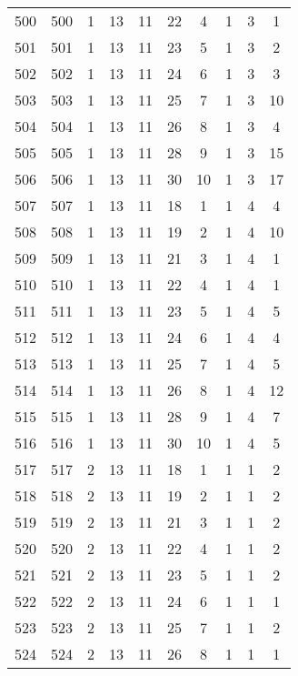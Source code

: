 \begin{longtable}{cccccccccc}
  500 & 500 &   1 &  13 &  11 &  22 &   4 &   1 &   3 &   1 \\ 
  501 & 501 &   1 &  13 &  11 &  23 &   5 &   1 &   3 &   2 \\ 
  502 & 502 &   1 &  13 &  11 &  24 &   6 &   1 &   3 &   3 \\ 
  503 & 503 &   1 &  13 &  11 &  25 &   7 &   1 &   3 &  10 \\ 
  504 & 504 &   1 &  13 &  11 &  26 &   8 &   1 &   3 &   4 \\ 
  505 & 505 &   1 &  13 &  11 &  28 &   9 &   1 &   3 &  15 \\ 
  506 & 506 &   1 &  13 &  11 &  30 &  10 &   1 &   3 &  17 \\ 
  507 & 507 &   1 &  13 &  11 &  18 &   1 &   1 &   4 &   4 \\ 
  508 & 508 &   1 &  13 &  11 &  19 &   2 &   1 &   4 &  10 \\ 
  509 & 509 &   1 &  13 &  11 &  21 &   3 &   1 &   4 &   1 \\ 
  510 & 510 &   1 &  13 &  11 &  22 &   4 &   1 &   4 &   1 \\ 
  511 & 511 &   1 &  13 &  11 &  23 &   5 &   1 &   4 &   5 \\ 
  512 & 512 &   1 &  13 &  11 &  24 &   6 &   1 &   4 &   4 \\ 
  513 & 513 &   1 &  13 &  11 &  25 &   7 &   1 &   4 &   5 \\ 
  514 & 514 &   1 &  13 &  11 &  26 &   8 &   1 &   4 &  12 \\ 
  515 & 515 &   1 &  13 &  11 &  28 &   9 &   1 &   4 &   7 \\ 
  516 & 516 &   1 &  13 &  11 &  30 &  10 &   1 &   4 &   5 \\ 
  517 & 517 &   2 &  13 &  11 &  18 &   1 &   1 &   1 &   2 \\ 
  518 & 518 &   2 &  13 &  11 &  19 &   2 &   1 &   1 &   2 \\ 
  519 & 519 &   2 &  13 &  11 &  21 &   3 &   1 &   1 &   2 \\ 
  520 & 520 &   2 &  13 &  11 &  22 &   4 &   1 &   1 &   2 \\ 
  521 & 521 &   2 &  13 &  11 &  23 &   5 &   1 &   1 &   2 \\ 
  522 & 522 &   2 &  13 &  11 &  24 &   6 &   1 &   1 &   1 \\ 
  523 & 523 &   2 &  13 &  11 &  25 &   7 &   1 &   1 &   2 \\ 
  524 & 524 &   2 &  13 &  11 &  26 &   8 &   1 &   1 &   1 \\ 

\end{longtable}
